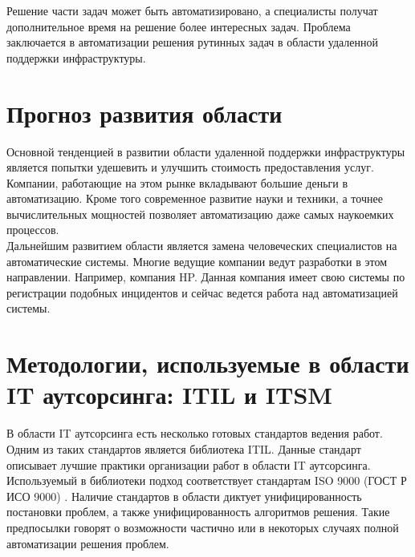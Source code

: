 Решение части задач может быть автоматизировано, а специалисты получат дополнительное время на решение более интересных задач. 
Проблема заключается в автоматизации решения рутинных задач в области удаленной поддержки инфраструктуры.


\section{Прогноз развития области} \label{sect1_2}
Основной тенденцией в развитии области удаленной поддержки инфраструктуры является попытки удешевить и улучшить стоимость предоставления услуг. \\
Компании, работающие на этом рынке вкладывают большие деньги в автоматизацию. Кроме того современное развитие науки и техники, а точнее вычислительных мощностей позволяет автоматизацию даже самых наукоемких процессов. \\
Дальнейшим развитием области является замена человеческих специалистов на автоматические системы. Многие ведущие компании ведут разработки в этом направлении. Например, компания HP. Данная компания имеет свою системы по регистрации подобных инцидентов и сейчас ведется работа над автоматизацией системы. \\

\section{Методологии, используемые в области IT аутсорсинга: ITIL и ITSM} \label{sect1_3}
В области IT аутсорсинга есть несколько готовых стандартов ведения работ. Одним из таких стандартов является библиотека ITIL. Данные стандарт описывает лучшие практики организации работ в области IT аутсорсинга. Используемый в библиотеки подход соответствует стандартам ISO 9000 (ГОСТ Р ИСО 9000) .
Наличие стандартов в области диктует унифицированность постановки проблем, а также унифицированность алгоритмов решения. Такие предпосылки говорят о возможности частично или в некоторых случаях полной автоматизации решения проблем.
